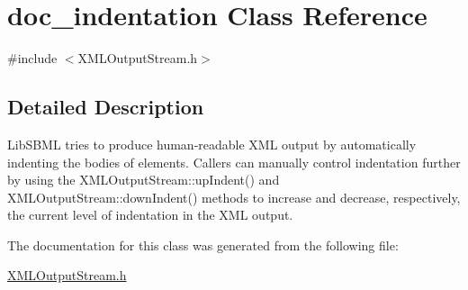 \hypertarget{classdoc__indentation}{}\section{doc\+\_\+indentation Class Reference}
\label{classdoc__indentation}


{\ttfamily \#include $<$X\+M\+L\+Output\+Stream.\+h$>$}



\subsection{Detailed Description}
Lib\+S\+B\+ML tries to produce human-\/readable X\+ML output by automatically indenting the bodies of elements. Callers can manually control indentation further by using the X\+M\+L\+Output\+Stream\+::up\+Indent() and X\+M\+L\+Output\+Stream\+::down\+Indent() methods to increase and decrease, respectively, the current level of indentation in the X\+ML output. 

The documentation for this class was generated from the following file\+:\begin{DoxyCompactItemize}
\item 
\hyperlink{_x_m_l_output_stream_8h}{X\+M\+L\+Output\+Stream.\+h}\end{DoxyCompactItemize}
